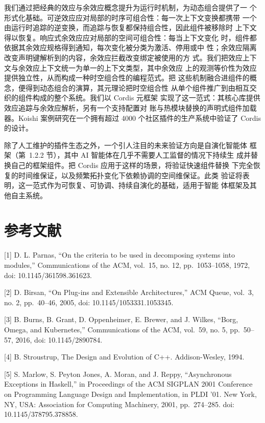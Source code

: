 \documentclass[
  10
]{article}
\begin{document}
我们通过把经典的效应与余效应概念提升为运行时机制，为动态组合提供了一
个形式化基础。可逆效应应对局部的时序可组合性：每一次上下文变换都携带
一个由运行时追踪的逆变换，而追踪与恢复都保持组合性，因此组件被移除时
上下文得以恢复。响应式余效应应对局部的空间可组合性：每当上下文变化
时，组件都依据其余效应规格得到通知，每次变化被分类为激活、停用或中
性；余效应隔离改变声明键解析到的内容，余效应拦截改变绑定被使用的方
式。我们把效应上下文与余效应上下文统一为单一的上下文类型，其中余效应
上的观测等价性为效应提供独立性，从而构成一种时空组合性的编程范式。把
这些机制融合进组件的概念，便得到动态组合的演算，其元理论把时空组合性
从单个组件推广到由相互交织的组件构成的整个系统。我们以 Cordis 元框架
实现了这一范式：其核心库提供效应追踪与余效应解析，另有一个支持配置对
账与热模块替换的声明式组件加载器。Koishi 案例研究在一个拥有超过 4000
个社区插件的生产系统中验证了 Cordis 的设计。

除了人工维护的插件生态之外，一个引人注目的未来验证方向是自演化智能体
框架（第~1.2.2 节），其中 AI 智能体在几乎不需要人工监督的情况下持续生
成并替换自己的框架组件。把 Cordis 应用于这样的场景，将验证快速组件替换
下完全恢复的时间维保证，以及频繁拓扑变化下依赖协调的空间维保证。此类
验证将表明，这一范式作为可恢复、可协调、持续自演化的基础，适用于智能
体框架及其他自主系统。

\section*{参考文献} \label{references}

{[}1{]} D. L. Parnas, ``On the criteria to be used in decomposing systems into modules,''
Communications of the ACM, vol.~15, no. 12, pp.~1053--1058, 1972, doi:
10.1145/361598.361623.

{[}2{]} D. Birsan, ``On Plug-ins and Extensible Architectures,'' ACM Queue, vol.~3, no. 2,
pp.~40--46, 2005, doi: 10.1145/1053331.1053345.

{[}3{]} B. Burns, B. Grant, D. Oppenheimer, E. Brewer, and J. Wilkes, ``Borg, Omega,
and Kubernetes,'' Communications of the ACM, vol.~59, no. 5, pp.~50--57, 2016, doi:
10.1145/2890784.

{[}4{]} B. Stroustrup, The Design and Evolution of C++. Addison-Wesley, 1994.

{[}5{]} S. Marlow, S. Peyton Jones, A. Moran, and J. Reppy, ``Asynchronous Exceptions
in Haskell,'' in Proceedings of the ACM SIGPLAN 2001 Conference on Programming
Language Design and Implementation, in PLDI '01. New York, NY, USA: Association
for Computing Machinery, 2001, pp.~274--285. doi: 10.1145/378795.378858.
\end{document}
